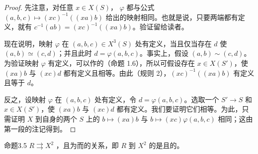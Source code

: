 \begin{proof}
先注意，对任意 $x\in X(S)$， $\varphi$ 都与公式 $(a,b,c)\mapsto(xc)^{-1}((xa)b)$ 给出的映射相同。也就是说，只要两端都有定义，就有 $c^{-1}(ab)=(xc)^{-1}((xa)b)$。验证留给读者。

现在说明，映射 $\varphi$ 在 $(a,b,c)\in X^3(S)$ 处有定义，当且仅当存在 $d$ 使 $(a,b)\simeq(c,d)$；并且此时 $d=\varphi(a,b,c)$。事实上，假设 $(a,b)\sim(c,d)$。为验证映射 $\varphi$ 有定义，可以作的（命题 1.6），所以可假设存在 $x\in X(S')$，使 $(xa)b$ 与 $(xc)d$ 都有定义且相等。由此（规则 2），$(xc)^{-1}((xa)b)$ 有定义且等于 $d$。

反之，设映射 $\varphi$ 在 $(a,b,c)$ 处有定义，令 $d=\varphi(a,b,c)$。选取一个 $S'\to S$ 和 $x\in X(S')$，使 $(xa)b$ 与 $(xc)d$ 都有定义。我们要证明它们相等。为此，只需证明 $X$ 到自身的两个 $S$ 上的 $b\mapsto(xa)b$ 与 $b\mapsto(xc)\varphi(a,b,c)$ 相同；这由第一段的注记得到。
\end{proof}
\begin{SGAresult}{命题}{3.5}
 $R\rightrightarrows X^2$ ，且为而的关系，即 $R$ 到 $X^2$ 的是且的。
\end{SGAresult}
